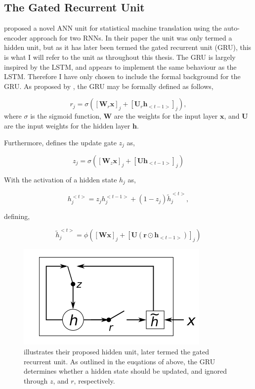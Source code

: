 \subsection{The Gated Recurrent Unit}\label{GRU}

\cite{Cho2014} proposed a novel ANN unit for statistical machine translation using the auto-encoder approach for two RNNs. In their paper the unit was only termed a hidden unit, but as it has later been termed the gated recurrent unit (GRU), this is what I will refer to the unit as throughout this thesis. The GRU is largely inspired by the LSTM, and appears to implement the same behaviour as the LSTM. Therefore I have only chosen to include the formal background for the GRU. As proposed by \cite{Cho2014}, the GRU may be formally defined as follows,

\begin{equation}
    r_j = \sigma ([\textbf{W}_r \textbf{x}]_j + [\textbf{U}_r\textbf{h}_{<t-1>}]_j), 
\end{equation}
where $\sigma$ is the sigmoid function, $\textbf{W}$ are the weights for the input layer $\textbf{x}$, and $\textbf{U}$ are the input weights for the hidden layer $\textbf{h}$.

Furthermore, \cite{Cho2014} defines the update gate $z_j$ as,

\begin{equation}
    z_j = \sigma([\textbf{W}_z\textbf{x}]_j + [\textbf{U}\textbf{h}_{<t-1>}]_j)
\end{equation}
 
With the activation of a hidden state $h_j$ as,
 
\begin{equation}
    h_j^{<t>} = z_j h_j^{<t-1>} + (1 - z_j) \tilde{h}_j^{<t>},
\end{equation}
 
defining,
 
\begin{equation}
    \tilde{h}_j^{<t>} = \phi ([\textbf{W}\textbf{x}]_j + [\textbf{U}(\textbf{r} \odot \textbf{h}_{<t-1>})]_j)
\end{equation}

\begin{figure}
\centering
\includegraphics{fig/cho_gru}
\caption{\cite{Cho2014} illustrates their proposed hidden unit, later termed the gated recurrent unit. As outlined in the euqations of \cite{Cho2014} above, the GRU determines whether a hidden state should be updated, and ignored through $z$, and $r$, respectively.}
\label{fig:cho_gru}
\end{figure}

